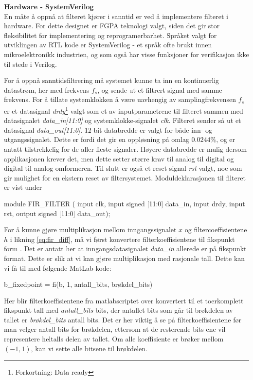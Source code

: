 \textbf{Hardware - SystemVerilog}\\
En måte å oppnå at filteret kjører i sanntid er ved å implementere filteret i hardware. For dette designet er FGPA 
teknologi valgt, siden det gir stor fleksibilitet for implementering og reprogramerbarhet. Språket valgt for utviklingen av 
RTL kode er SystemVerilog - et språk ofte brukt innen mikroelektronikk industrien, og som også har visse funksjoner for verifikasjon ikke til stede
i Verilog.

For å oppnå sanntidsfiltrering må systemet kunne ta inn en kontinuerlig datastrøm, her med frekvens $f_s$, og sende ut et filtrert signal 
med samme frekvens. For å tillate systemklokken å være uavhengig av samplingfrekvensen $f_s$ er et datasignal \textit{drdy}\footnote{Forkortning: Data ready}
valgt som et av inputparametrene til filteret sammen med datasignalet \textit{data\_in[11:0]} og systemklokke-signalet \textit{clk}. Filteret sender så ut 
et datasignal \textit{data\_out[11:0]}. 12-bit databredde er valgt for både inn- og utgangssignalet. Dette er fordi det gir en oppløsning på omlag $0.0244$\%,
og er antatt tilstrekkelig for de aller fleste signaler. Høyere databredde er mulig dersom applikasjonen krever det, men dette setter større krav til 
analog til digital og digital til analog omformeren. Til slutt er også et reset signal \textit{rst} valgt, noe som gir mulighet for en ekstern reset av filtersystemet.
Moduldeklarasjonen til filteret er vist under
\begin{verilogcode}
module FIR_FILTER (
    input                   clk,
    input   signed  [11:0]  data_in,
    input                   drdy,
    input                   rst,
    output  signed  [11:0]  data_out);
\end{verilogcode}

For å kunne gjøre multiplikasjon mellom inngangssignalet $x$ og filtercoeffisientene $h$ i likning
\ref{eq:fir_diff}, må vi først konvertere filterkoeffisientene til fikspunkt form \cite{fixed_point}. 
Det er antatt her at inngangsdatasignalet \textit{data\_in} allerede er på fikspunkt format.
Dette er slik at vi kan gjøre multiplikasjon med rasjonale tall. Dette kan vi få til med følgende MatLab kode:
\begin{matlabcode}
b_fixedpoint = fi(b, 1, antall_bits, brøkdel_bits) 
\end{matlabcode}
Her blir filterkoeffisientene fra matlabscriptet over konvertert til et toerkomplett fikspunkt tall 
med \textit{antall\_bits} bits, der antallet bits som går til brøkdelen av tallet er \textit{brøkdel\_bits} antall bits.
Det er her viktig å se på filterkoeffisientene før man velger antall bits for brøkdelen, ettersom at de resterende bits-ene vil representere 
heltalls delen av tallet. Om alle koeffisiente er brøker mellom $(-1, 1)$, kan vi sette alle bitsene til brøkdelen.

